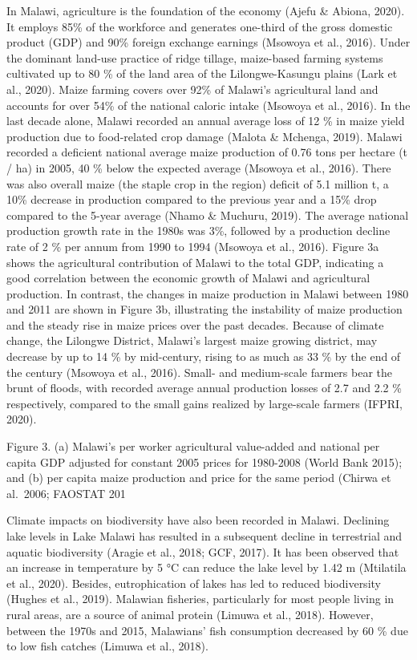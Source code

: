\documentclass[
]{book}
\begin{document}
In Malawi, agriculture is the foundation of the economy (Ajefu \& Abiona, 2020). It employs 85\% of the workforce and generates one-third of the gross domestic
product (GDP) and 90\% foreign exchange earnings (Msowoya et al., 2016). Under the dominant land-use practice of ridge tillage, maize-based farming systems
cultivated up to 80 \% of the land area of the Lilongwe-Kasungu plains (Lark et al., 2020). Maize farming covers over 92\% of Malawi's agricultural land and
accounts for over 54\% of the national caloric intake (Msowoya et al., 2016). In the last decade alone, Malawi recorded an annual average loss of 12 \% in maize
yield production due to food-related crop damage (Malota \& Mchenga, 2019). Malawi recorded a deficient national average maize production of 0.76 tons per hectare
(t / ha) in 2005, 40 \% below the expected average (Msowoya et al., 2016). There was also overall maize (the staple crop in the region) deficit of 5.1 million t,
a 10\% decrease in production compared to the previous year and a 15\% drop compared to the 5-year average (Nhamo \& Muchuru, 2019). The average national production
growth rate in the 1980s was 3\%, followed by a production decline rate of 2 \% per annum from 1990 to 1994 (Msowoya et al., 2016). Figure 3a shows the
agricultural contribution of Malawi to the total GDP, indicating a good correlation between the economic growth of Malawi and agricultural production. In
contrast, the changes in maize production in Malawi between 1980 and 2011 are shown in Figure 3b, illustrating the instability of maize production and the steady
rise in maize prices over the past decades. Because of climate change, the Lilongwe District, Malawi's largest maize growing district, may decrease by up to 14 \%
by mid-century, rising to as much as 33 \% by the end of the century (Msowoya et al., 2016). Small- and medium-scale farmers bear the brunt of floods, with
recorded average annual production losses of 2.7 and 2.2 \% respectively, compared to the small gains realized by large-scale farmers (IFPRI, 2020).

Figure 3. (a) Malawi's per worker agricultural value-added and national per capita GDP adjusted for constant 2005 prices for 1980-2008 (World Bank 2015); and (b) per capita maize production and price for the same period (Chirwa et al.~2006; FAOSTAT 201

Climate impacts on biodiversity have also been recorded in Malawi. Declining lake levels in Lake Malawi has resulted in a subsequent decline in terrestrial and
aquatic biodiversity (Aragie et al., 2018; GCF, 2017). It has been observed that an increase in temperature by 5 °C can reduce the lake level by 1.42 m
(Mtilatila et al., 2020). Besides, eutrophication of lakes has led to reduced biodiversity (Hughes et al., 2019). Malawian fisheries, particularly for most
people living in rural areas, are a source of animal protein (Limuwa et al., 2018). However, between the 1970s and 2015, Malawians' fish consumption decreased by
60 \% due to low fish catches (Limuwa et al., 2018).
\end{document}

